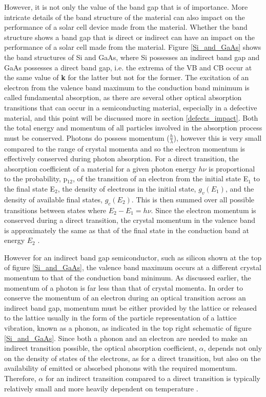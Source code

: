 \documentclass[11pt, twoside]{report}
\begin{document}
However, it is not only the value of the band gap that is of importance. More intricate details of the band structure of the material can also impact on the performance of a solar cell device made from the material. Whether the band structure shows a band gap that is direct or indirect can have an impact on the performance of a solar cell made from the material. Figure \ref{Si_and_GaAs} shows the band structures of Si and GaAs, where Si possesses an indirect band gap and GaAs possesses a direct band gap, i.e. the extrema of the VB and CB occur at the same value of \textbf{k} for the latter but not for the former. The excitation of an electron from the valence band maximum to the conduction band minimum is called fundamental absorption, as there are several other optical absorption transitions that can occur in a semiconducting material, especially in a defective material, and this point will be discussed more in section \ref{defects_impact}. Both the total energy and momentum of all particles involved in the absorption process must be conserved. Photons do possess momentum ($\frac{h}{\lambda}$), however this is very small compared to the range of crystal momenta and so the electron momentum is effectively conserved during photon absorption. For a direct transition, the absorption coefficient of a material for a given photon energy $h \nu$ is proportional to the probability, p$_{12}$, of the transition of an electron from the initial state E$_1$ to the final state E$_2$, the density of electrons in the initial state, $g_{v}(E_1)$, and the density of available final states, $g_{c}(E_2)$. This is then summed over all possible transitions between states where $E_2 - E_1 = h\nu$. Since the electron momentum is conserved during a direct transition, the crystal momentum in the valence band is approximately the same as that of the final state in the conduction band at energy $E_2$ \cite{PV_bands_book}.

However for an indirect band gap semiconductor, such as silicon shown at the top of figure \ref{Si_and_GaAs}, the valence band maximum occurs at a different crystal momentum to that of the conduction band minimum. As discussed earlier, the momentum of a photon is far less than that of crystal momenta. In order to conserve the momentum of an electron during an optical transition across an indirect band gap, momentum must be either provided by the lattice or released to the lattice usually in the form of the particle representation of a lattice vibration, known as a phonon, as indicated in the top right schematic of figure \ref{Si_and_GaAs}. Since both a phonon and an electron are needed to make an indirect transition possible, the optical absorption coefficient, $\alpha$, depends not only on the density of states of the electrons, as for a direct transition, but also on the availability of emitted or absorbed phonons with the required momentum. Therefore, $\alpha$ for an indirect transition compared to a direct transition is typically relatively small and more heavily dependent on temperature \cite{Nelson3}. 
\end{document}
